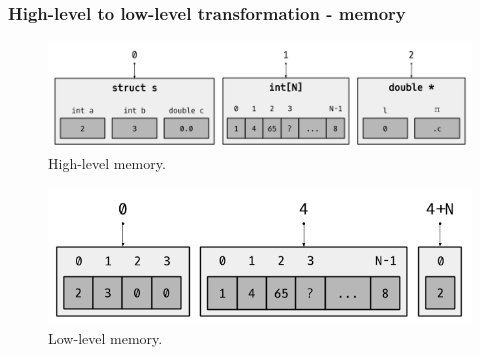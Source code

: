\begin{frame}[fragile]
\frametitle{High-level to low-level transformation - memory}

\begin{center}

\begin{figure}
	\includegraphics[scale=0.31]{images/high_level_memory}
	\caption{High-level memory.}
\end{figure}

\begin{figure}
	\includegraphics[scale=0.31]{images/low_level_memory}
	\caption{Low-level memory.}
\end{figure}

\end{center}

\end{frame}


